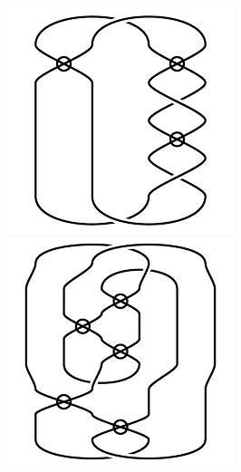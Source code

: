 \begin{figure}[H]
\begin{minipage}[b]{.18\linewidth}
\centering
\includegraphics[width=\linewidth]{../data/virtual_4_102.png}
\end{minipage}
\begin{minipage}[b]{.18\linewidth}
\centering
\includegraphics[width=\linewidth]{../data/virtual_4_103.png}

\end{minipage}
\end{figure}
